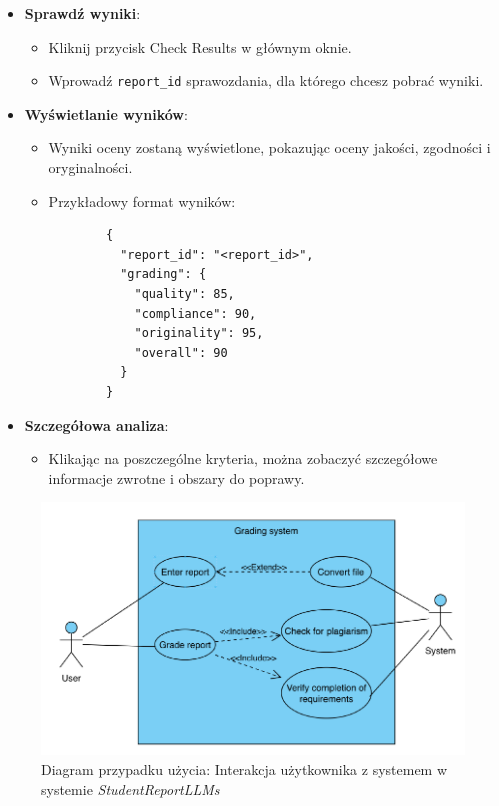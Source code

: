 \documentclass[a4paper, 12pt]{article}
\begin{document}
\begin{itemize}
    \item \textbf{Sprawdź wyniki}:
    \begin{itemize}
        \item Kliknij przycisk Check Results w głównym oknie.
        \item Wprowadź \texttt{report\_id} sprawozdania, dla którego chcesz pobrać wyniki.
    \end{itemize}
    \item \textbf{Wyświetlanie wyników}:
    \begin{itemize}
        \item Wyniki oceny zostaną wyświetlone, pokazując oceny jakości, zgodności i oryginalności.
        \item Przykładowy format wyników:
        \begin{verbatim}
        {
          "report_id": "<report_id>",
          "grading": {
            "quality": 85,
            "compliance": 90,
            "originality": 95,
            "overall": 90
          }
        }
        \end{verbatim}
    \end{itemize}
    \item \textbf{Szczegółowa analiza}:
    \begin{itemize}
        \item Klikając na poszczególne kryteria, można zobaczyć szczegółowe informacje zwrotne i obszary do poprawy.
    \end{itemize}
\end{itemize}

\newpage

\begin{figure}[H]
    \centering
    \includegraphics[width=\textwidth]{img/usecase_diagram}
    \caption{Diagram przypadku użycia: Interakcja użytkownika z systemem w systemie \textit{StudentReportLLMs}}
    \label{fig:use-case-diagram}
\end{figure}
\end{document}
